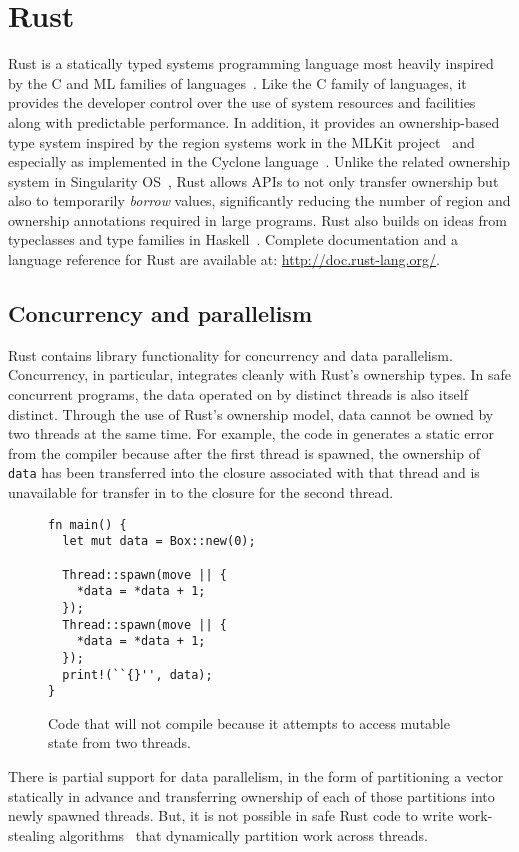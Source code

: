 
\section{Rust}
\label{sec:rust}

Rust is a statically typed systems programming language most heavily inspired by the C
and ML families of languages~\cite{RUST}.
Like the C family of languages, it provides the developer control over the use of system
resources and facilities along with predictable performance.
In addition, it provides an ownership-based type system inspired by the region systems work in the
MLKit project~\cite{mlkit} and especially as implemented in the Cyclone language~\cite{cyclone}.
Unlike the related ownership system in Singularity OS~\cite{singularity}, Rust allows APIs to
not only transfer ownership but also to temporarily \emph{borrow} values, significantly
reducing the number of region and ownership annotations required in large programs.
Rust also builds on ideas from typeclasses and type families in Haskell~\cite{haskell}.
Complete documentation and a language reference for Rust are available at: \url{http://doc.rust-lang.org/}.

\subsection{Concurrency and parallelism}
Rust contains library functionality for concurrency and data parallelism.
Concurrency, in particular, integrates cleanly with Rust's ownership types.
In safe concurrent programs, the data operated on by distinct threads is also itself distinct.
Through the use of Rust's ownership model, data cannot be owned by two threads at the same time.
For example, the code in  generates a static error from the compiler because
after the first thread is spawned, the ownership of \lstinline{data} has been transferred into the
closure associated with that thread and is unavailable for transfer in to the closure for the second thread.
\begin{figure}
\begin{lstlisting}
fn main() {
  let mut data = Box::new(0);

  Thread::spawn(move || {
    *data = *data + 1;
  });
  Thread::spawn(move || {
    *data = *data + 1;
  });
  print!(``{}'', data);
}
\end{lstlisting}
  \caption{Code that will not compile because it attempts to access mutable state from two threads.}
  \label{fig:bad-concurrency}
\end{figure}

There is partial support for data parallelism, in the form of partitioning a vector statically in advance
and transferring ownership of each of those partitions into newly spawned threads.
But, it is not possible in safe Rust code to write work-stealing algorithms~\cite{blumeofe:multiprogrammed-work-stealing}
that dynamically partition work across threads.



